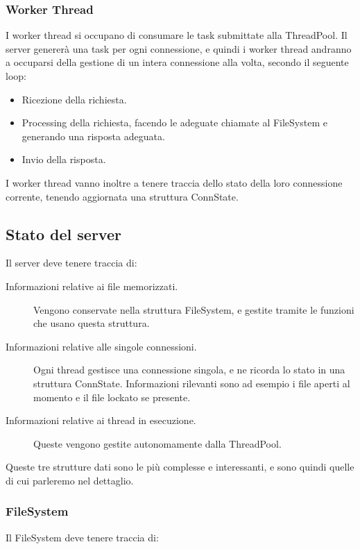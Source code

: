 \documentclass[11pt]{article}
\begin{document}
\begin{flushleft}
\subsubsection{Worker Thread}
I worker thread si occupano di consumare le task submittate alla ThreadPool. Il server genererà una task per ogni connessione, e quindi i worker thread andranno a occuparsi della gestione di un intera connessione alla volta, secondo il seguente loop: 
\begin{itemize}

\item Ricezione della richiesta.

\item Processing della richiesta, facendo le adeguate chiamate al FileSystem e generando una risposta adeguata.

\item Invio della risposta.

\end{itemize}

I worker thread vanno inoltre a tenere traccia dello stato della loro connessione corrente, tenendo aggiornata una struttura ConnState.

\subsection{Stato del server}
Il server deve tenere traccia di:
\begin{description}

\item[Informazioni relative ai file memorizzati.] Vengono conservate nella struttura FileSystem, e gestite tramite le funzioni che usano questa struttura.

\item[Informazioni relative alle singole connessioni.] Ogni thread gestisce una connessione singola, e ne ricorda lo stato in una struttura ConnState. Informazioni rilevanti sono ad esempio i file aperti al momento e il file lockato se presente.

\item[Informazioni relative ai thread in esecuzione.] Queste vengono gestite autonomamente dalla ThreadPool.

\end{description}

Queste tre strutture dati sono le più complesse e interessanti, e sono quindi quelle di cui parleremo nel dettaglio.

\subsubsection{FileSystem}
Il FileSystem deve tenere traccia di:
\begin{description}


\end{description}
\end{flushleft}
\end{document}
